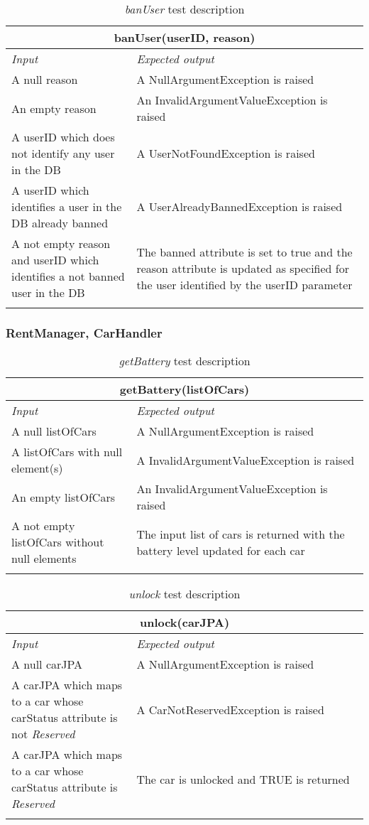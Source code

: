 \begin{longtable}{p{0.35\linewidth}p{0.65\linewidth}}
\multicolumn{2}{c}{\textbf{banUser(userID, reason)}} \\
\toprule
\emph{Input} & \emph{Expected output} \\
\midrule
A null reason & A NullArgumentException is raised\\
\midrule
An empty reason & An InvalidArgumentValueException is raised\\
\midrule
A userID which does not identify any user in the DB & A UserNotFoundException is raised\\
\midrule
A userID which identifies a user in the DB already banned & A UserAlreadyBannedException is raised\\
\midrule
A not empty reason and userID which identifies a not banned user in the DB & The banned attribute is set to true and the reason attribute is updated as specified for the user identified by the userID parameter\\
\bottomrule
\caption{\label{tbl:banUser}\emph{banUser} test description}
\end{longtable}

\subsubsection{RentManager, CarHandler}

\begin{longtable}{p{0.35\linewidth}p{0.65\linewidth}}
\multicolumn{2}{c}{\textbf{getBattery(listOfCars)}} \\
\toprule
\emph{Input} & \emph{Expected output} \\
\midrule
A null listOfCars & A NullArgumentException is raised\\
\midrule
A listOfCars with null element(s) & A InvalidArgumentValueException is raised\\
\midrule
An empty listOfCars & An InvalidArgumentValueException is raised \\
\midrule
A not empty listOfCars without null elements & The input list of cars is returned with the battery level updated for each car\\
\bottomrule
\caption{\emph{getBattery} test description}
\end{longtable}


\begin{longtable}{p{0.35\linewidth}p{0.65\linewidth}}
\multicolumn{2}{c}{\textbf{unlock(carJPA)}} \\
\toprule
\emph{Input} & \emph{Expected output} \\
\midrule
A null carJPA & A NullArgumentException is raised\\
\midrule
A carJPA which maps to a car whose carStatus attribute is not \emph{Reserved} & A CarNotReservedException is raised \\
\midrule
A carJPA which maps to a car whose carStatus attribute is \emph{Reserved} & The car is unlocked and TRUE is returned\\
\bottomrule
\caption{\label{tbl:unlock}\emph{unlock} test description}
\end{longtable}


